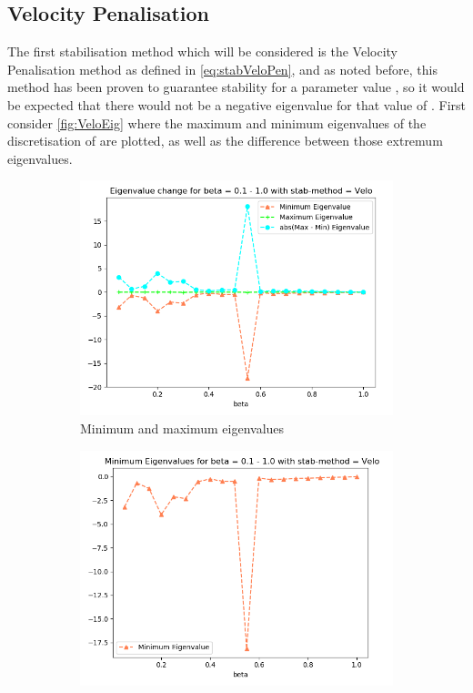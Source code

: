 \subsection{Velocity Penalisation}
The first stabilisation method which will be considered is the Velocity Penalisation method as defined in \autoref{eq:stabVeloPen}, and as noted before, this method has been proven to guarantee stability for a parameter value , so it would be expected that there would not be a negative eigenvalue for that value of \mbeta. First consider \autoref{fig:VeloEig} where the maximum and minimum eigenvalues of the discretisation of  are plotted, as well as the difference between those extremum eigenvalues.
\begin{figure}[ht]
     \centering
     \begin{subfigure}[h]{0.49\textwidth}
        \centering
        \includegraphics[width=\textwidth]{latex/Thesis/media/Beta_1_thru_0_velo.png}
        \caption{Minimum and maximum eigenvalues\label{fig:VeloEig}}
     \end{subfigure}
     \hfill
     \begin{subfigure}[h]{0.49\textwidth}
        \centering
        \includegraphics[width=\textwidth]{latex/Thesis/media/Beta_1_thru_0_velo_min.png}

\end{subfigure}
\end{figure}
